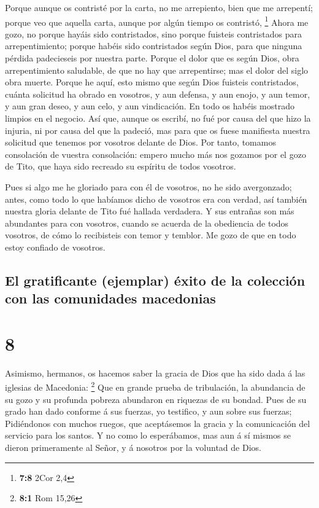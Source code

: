  Porque aunque os contristé por la carta, no me
arrepiento, bien que me arrepentí; porque veo que aquella carta, aunque
por algún tiempo os contristó, \footnote{\textbf{7:8} 2Cor 2,4}
 Ahora me gozo, no porque hayáis sido contristados, sino
porque fuisteis contristados para arrepentimiento; porque habéis sido
contristados según Dios, para que ninguna pérdida padecieseis por
nuestra parte.  Porque el dolor que es según Dios, obra
arrepentimiento saludable, de que no hay que arrepentirse; mas el dolor
del siglo obra muerte.  Porque he aquí, esto mismo que
según Dios fuisteis contristados, cuánta solicitud ha obrado en
vosotros, y aun defensa, y aun enojo, y aun temor, y aun gran deseo, y
aun celo, y aun vindicación. En todo os habéis mostrado limpios en el
negocio.  Así que, aunque os escribí, no fué por causa
del que hizo la injuria, ni por causa del que la padeció, mas para que
os fuese manifiesta nuestra solicitud que tenemos por vosotros delante
de Dios.  Por tanto, tomamos consolación de vuestra
consolación: empero mucho más nos gozamos por el gozo de Tito, que haya
sido recreado su espíritu de todos vosotros.

 Pues si algo me he gloriado para con él de vosotros, no
he sido avergonzado; antes, como todo lo que habíamos dicho de vosotros
era con verdad, así también nuestra gloria delante de Tito fué hallada
verdadera.  Y sus entrañas son más abundantes para con
vosotros, cuando se acuerda de la obediencia de todos vosotros, de cómo
lo recibisteis con temor y temblor.  Me gozo de que en
todo estoy confiado de vosotros.

\hypertarget{el-gratificante-ejemplar-uxe9xito-de-la-colecciuxf3n-con-las-comunidades-macedonias}{%
\subsection{El gratificante (ejemplar) éxito de la colección con las
comunidades
macedonias}\label{el-gratificante-ejemplar-uxe9xito-de-la-colecciuxf3n-con-las-comunidades-macedonias}}

\hypertarget{section-7}{%
\section{8}\label{section-7}}

 Asimismo, hermanos, os hacemos saber la gracia de Dios
que ha sido dada á las iglesias de Macedonia: \footnote{\textbf{8:1} Rom
  15,26}  Que en grande prueba de tribulación, la
abundancia de su gozo y su profunda pobreza abundaron en riquezas de su
bondad.  Pues de su grado han dado conforme á sus fuerzas,
yo testifico, y aun sobre sus fuerzas;  Pidiéndonos con
muchos ruegos, que aceptásemos la gracia y la comunicación del servicio
para los santos.  Y no como lo esperábamos, mas aun á sí
mismos se dieron primeramente al Señor, y á nosotros por la voluntad de
Dios.

